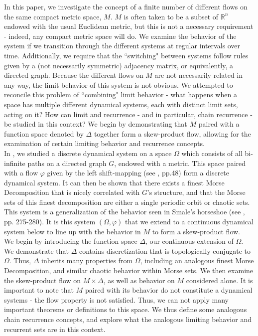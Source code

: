 \documentclass[11pt]{article}
\begin{document}
\indent In this paper, we investigate the concept of a finite number of different flows on the same compact metric space, $M$.  $M$ is often taken to be a subset of $\mathbb{R}^n$ endowed with the usual Euclidean metric, but this is not a necessary requirement - indeed, any compact metric space will do.  We examine the behavior of the system if we transition through the different systems at regular intervals over time.  Additionally, we require that the ``switching" between systems follow rules given by a (not necessarily symmetric) adjacency matrix, or equivalently, a directed graph.  Because the different flows on $M$ are not necessarily related in any way, the limit behavior of this system is not obvious.  We attempted to reconcile this problem of ``combining" limit behavior - what happens when a space has multiple different dynamical systems, each with distinct limit sets, acting on it?  How can limit and recurrence - and in particular, chain recurrence - be studied in this context? We begin by demonstrating that $M$ paired with a function space denoted by $\Delta$ together form a skew-product flow, allowing for the examination of certain limiting behavior and recurrence concepts. \\
\indent In \cite{discretesystems}, we studied a discrete dynamical system on a space $\Omega$ which consists of all bi-infinite paths on a directed graph $G$, endowed with a metric.   This space paired with a flow $\varphi$ given by the left shift-mapping (see \cite{Katok}, pp.48) form a discrete dynamical system.  It can then be shown that there exists a finest Morse Decomposition that is nicely correlated with $G$'s structure, and that the Morse sets of this finest decomposition are either a single periodic orbit or chaotic sets.  This system is a generalization of the behavior seen in Smale's horseshoe (see 
\cite{Robinson}, pp. 275-280).  It is this system $(\Omega, \varphi)$ that we extend to a continuous dynamical system below to line up with the behavior in $M$ to form a skew-product flow.\\
\indent We begin by introducing the function space $\Delta$, our continuous extension of $\Omega$.  We demonstrate that $\Delta$ contains discretization that is topologically conjugate to $\Omega$.  Thus, $\Delta$ inherits many properties from $\Omega$, including an analogous finest Morse Decomposition, and similar chaotic behavior within Morse sets.  We then examine the skew-product flow on $M\times\Delta$, as well as behavior on $M$ considered alone.  It is important to note that $M$ paired with its behavior do not constitute a dynamical systems - the flow property is not satisfied.  Thus, we can not apply many important theorems or definitions to this space.  We thus define some analogous chain recurrence concepts, and explore what the analogous limiting behavior and recurrent sets are in this context.
\end{document}
